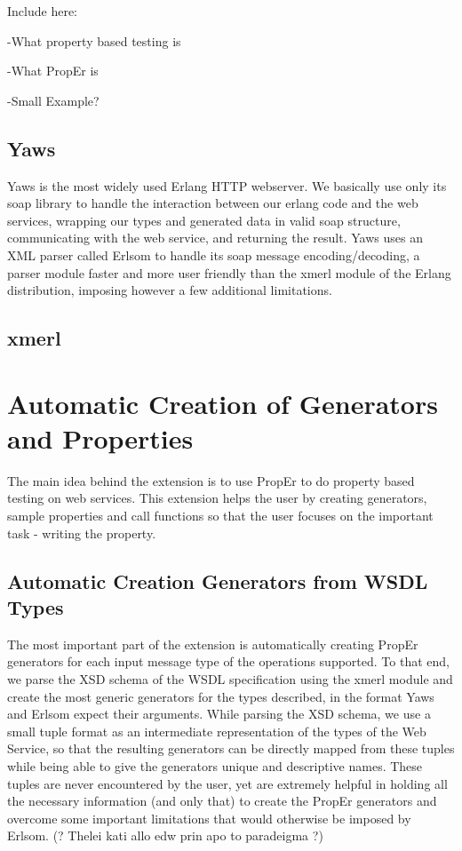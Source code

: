 \documentclass[submission,copyright,a4]{eptcs}
\begin{document}
Include here:

-What property based testing is

-What PropEr is

-Small Example?

\subsection{Yaws}

Yaws is the most widely used Erlang HTTP webserver. We basically use only its soap library to handle the interaction between our erlang code and the web services, wrapping our types and generated data in valid soap structure, communicating with the web service, and returning the result. Yaws uses an XML parser called Erlsom to handle its soap message encoding/decoding, a parser module faster and more user friendly than the xmerl module of the Erlang distribution, imposing however a few additional limitations.

\subsection{xmerl}


\section{Automatic Creation of Generators and Properties}

The main idea behind the extension is to use PropEr to do property based testing on web services. This extension helps the user by creating generators, sample properties and call functions so that the user focuses on the important task - writing the property. 

\subsection{Automatic Creation Generators from WSDL Types}

The most important part of the extension is automatically creating PropEr generators for each input message type of the operations supported. To that end, we parse the XSD schema of the WSDL specification using the xmerl module and create the most generic generators for the types described, in the format Yaws and Erlsom expect their arguments. While parsing the XSD schema, we use a small tuple format as an intermediate representation of the types of the Web Service, so that the resulting generators can be directly mapped from these tuples while being able to give the generators unique and descriptive names. These tuples are never encountered by the user, yet are extremely helpful in holding all the necessary information (and only that) to create the PropEr generators and overcome some important limitations that would otherwise be imposed by Erlsom. (? Thelei kati allo edw prin apo to paradeigma ?)
\end{document}
